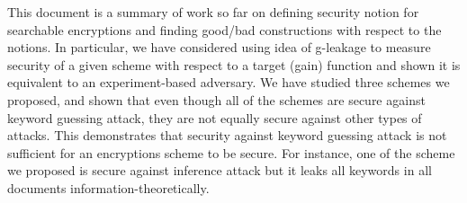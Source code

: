 This document is a summary of work so far on defining security notion for searchable encryptions and finding good/bad constructions with respect to the notions. In particular, we have considered using idea of g-leakage to measure security of a given scheme with respect to a target (gain) function and shown it is equivalent to an experiment-based adversary. We have studied three schemes we proposed, and shown that even though all of the schemes are secure against keyword guessing attack, they are not equally secure against other types of attacks. This demonstrates that security against keyword guessing attack is not sufficient for an encryptions scheme to be secure. For instance, one of the scheme we proposed is secure against inference attack but it leaks all keywords in all documents information-theoretically.